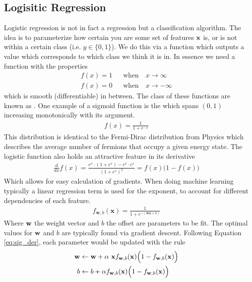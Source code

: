 \subsection{Logisitic Regression}
Logistic regression is not in fact a regression but a classification algorithm. The idea is to parameterize how certain you are some set of features $\textbf{x}$ is, or is not within a certain class (i.e. $y\in \{0,1\}$). We do this via a function which outputs a value which corresponds to which class we think it is in. In essence we need a function with the properties
\begin{align}
    f(x)=1 &&\textrm{when}&~ x\rightarrow\infty\\
    f(x)=0 &&\textrm{when}&~ x\rightarrow-\infty
\end{align}
which is smooth (differentiable) in between. The class of these functions are known as .  One example of a sigmoid function is the  which spans $(0,1)$ increasing monotonically with its argument.
\begin{align}
	f(x) = \frac{1}{1+e^{-x}}
\end{align}
This distribution is identical to the Fermi-Dirac distribution from Physics which describes the average number of fermions that occupy a given energy state. The logistic function also holds an attractive feature in its derivative
\begin{align}\label{eq:sig_der}
    \frac{d}{dx}f(x) = \frac{e^x\cdot(1+e^x)-e^x\cdot e^x}{(1+e^x)^2} = f(x)\Big(1-f(x)\Big)
\end{align}
Which allows for easy calculation of gradients. When doing machine learning typically a linear regression term is used for the exponent, to account for different dependencies of each feature.
\begin{align}
	f_{\mathbf{w},b}(\mathbf{x}) = \frac{1}{1+e^{-(\mathbf{wx} +b)}}
\end{align}
Where $\textbf{w}$ the weight vector and $b$ the offset are parameters to be fit. The optimal values for $\textbf{w}$ and $b$ are typically found via gradient descent. Following Equation \ref{eq:sig_der}, each parameter would be updated with the rule
\begin{align}
    \textbf{w}&\leftarrow\textbf{w}+\alpha~\textbf{x} f_{\mathbf{w},b}(\mathbf{x}) \Big(1-f_{\mathbf{w},b}(\mathbf{x})\Big)\\
    b&\leftarrow b +\alpha f_{\mathbf{w},b}(\mathbf{x}) \Big(1-f_{\mathbf{w},b}(\mathbf{x})\Big)
\end{align}


